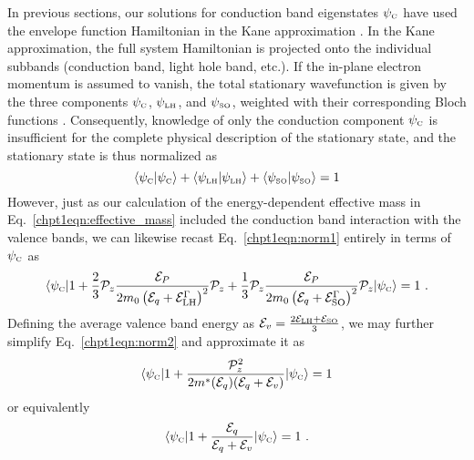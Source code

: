 \documentclass[12pt]{report}
\begin{document}
In previous sections, our solutions for conduction band eigenstates $\psi_{\textnormal{\tiny{C}}}$ have used the envelope function Hamiltonian in the Kane approximation \cite{Bastard:book:1991}.  In the Kane approximation, the full system Hamiltonian is projected onto the individual subbands (conduction band, light hole band, etc.).  If the in-plane electron momentum is assumed to vanish, the total stationary wavefunction is given by the three components $\psi_{\textnormal{\tiny{C}}}$, $\psi_{\textnormal{\tiny{LH}}}$, and $\psi_{\textnormal{\tiny{SO}}}$, weighted with their corresponding Bloch functions \cite{Sirtori:PRB:1994}.  Consequently, knowledge of only the conduction component $\psi_{\textnormal{\tiny{C}}}$ is insufficient for the complete physical description of the stationary state, and the stationary state is thus normalized as \cite{Sirtori:PRB:1994}
\begin{equation}
\label{chpt1eqn:norm1}
\langle \psi_{\textnormal{\tiny{C}}} | \psi_{\textnormal{\tiny{C}}} \rangle + \langle \psi_{\textnormal{\tiny{LH}}} | \psi_{\textnormal{\tiny{LH}}} \rangle + \langle \psi_{\textnormal{\tiny{SO}}} | \psi_{\textnormal{\tiny{SO}}} \rangle = 1
\end{equation}
However, just as our calculation of the energy-dependent effective mass in Eq.~\eqref{chpt1eqn:effective_mass} included the conduction band interaction with the valence bands, we can likewise recast Eq.~\eqref{chpt1eqn:norm1} entirely in terms of $\psi_{\textnormal{\tiny{C}}}$ as \cite{Sirtori:PRB:1994}
\begin{equation}
\label{chpt1eqn:norm2}
\langle \psi_\tn{\tiny{C}} | 1+\frac{2}{3}\mathcal{P}_z \frac{\EE_P}{2 m_0 \left(\EE_q+\EE_{\tn{LH}}^\Gamma\right)^2} \mathcal{P}_z +  \frac{1}{3}\mathcal{P}_z \frac{\EE_P}{2 m_0 \left(\EE_q+\EE_{\tn{SO}}^\Gamma\right)^2} \mathcal{P}_z| \psi_\tn{\tiny{C}} \rangle= 1 \tn{~.}
\end{equation}
Defining the average valence band energy as
$\EE_v = \frac{2 \EE_\tn{LH} + \EE_\tn{SO}}{3}$, we may further simplify Eq.~\eqref{chpt1eqn:norm2} and approximate it as \cite{Leavitt:PRB:1991}
\begin{equation}
\langle \psi_\tn{\tiny{C}} |1 + \frac{\mathcal{P}_z^2}{2 m^*(\EE_q) (\EE_q+\EE_v)} | \psi_\tn{\tiny{C}} \rangle = 1
\end{equation}
or equivalently
\begin{equation}
\langle \psi_\tn{\tiny{C}} |1 +  \frac{\EE_q}{\EE_q+\EE_v} | \psi_\tn{\tiny{C}} \rangle = 1 \tn{~.}
\end{equation}


\end{document}
